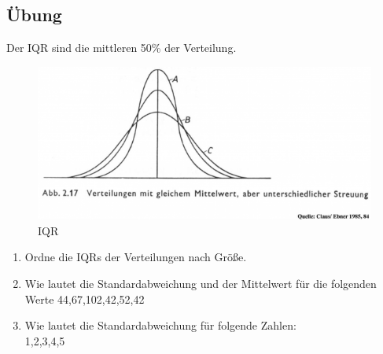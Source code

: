 \subsection{Übung}
Der IQR sind die mittleren 50\% der Verteilung.
\begin{figure}[h]
 \centering
 \includegraphics[scale=0.6]{./img/IQR_1.png}
 \caption{IQR}
\end{figure}
\vspace{0.5cm}
\begin{enumerate}
\item Ordne die IQRs der Verteilungen nach Größe. 
\item Wie lautet die Standardabweichung und der Mittelwert für die folgenden Werte 44,67,102,42,52,42 
\item Wie lautet die Standardabweichung für folgende Zahlen:\\
1,2,3,4,5 
\end{enumerate}

